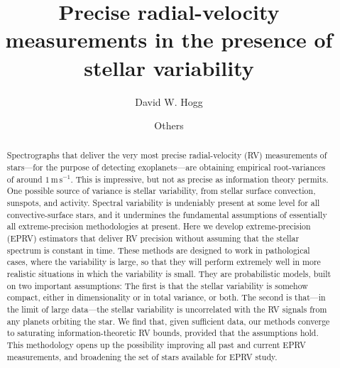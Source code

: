 \documentclass[modern]{aastex62}
\newcommand{\unit}[1]{\mathrm{#1}}
\newcommand{\m}{\unit{m}}
\newcommand{\s}{\unit{s}}
\newcommand{\ms}{\m\,\s^{-1}}
\begin{document}
\sloppy\sloppypar\raggedbottom\frenchspacing %
\graphicspath{ {figures/} }

\title{\textbf{Precise radial-velocity measurements in the presence of stellar variability}}

\author[0000-0003-2866-9403]{David W. Hogg}

\author{Others}

\begin{abstract}\noindent
Spectrographs that deliver the very most precise radial-velocity (RV)
measurements of stars---for the purpose of detecting exoplanets---are
obtaining empirical root-variances of around $1\,\ms$.
This is impressive, but not as precise as information theory
permits.
One possible source of variance is stellar variability, from stellar
surface convection, sunspots, and activity.
Spectral variability is undeniably present at some level for all
convective-surface stars, and it undermines the fundamental
assumptions of essentially all extreme-precision methodologies at
present.
Here we develop extreme-precision (EPRV) estimators that
deliver RV precision without assuming that the stellar spectrum is
constant in time.
These methods are designed to work in pathological cases, where the
variability is large, so that they will perform extremely well in more
realistic situations in which the variability is small.
They are probabilistic models, built on two important assumptions:
The first is that the stellar variability is somehow compact, either
in dimensionality or in total variance, or both.
The second is that---in the limit of large data---the stellar
variability is uncorrelated with the RV signals from any planets
orbiting the star.
We find that, given sufficient data, our methods converge to saturating
information-theoretic RV bounds, provided that the assumptions hold.
This methodology opens up the possibility improving all past and current
EPRV measurements, and broadening the set of stars available for EPRV study.
\end{abstract}

\end{document}
